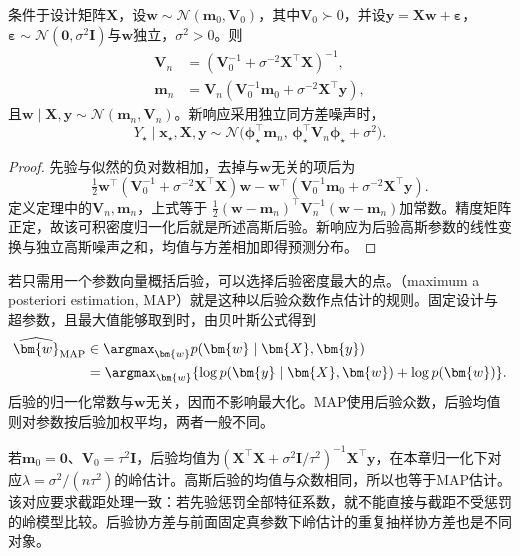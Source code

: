 \begin{theorem}[贝叶斯线性回归的后验与预测]
  \label{thm:regression-bayesian-linear}
  条件于设计矩阵$\bm{X}$，设$\bm{w}\sim\mathcal{N}(\bm{m}_0,\bm{V}_0)$，其中$\bm{V}_0\succ0$，并设$\bm{y}=\bm{X}\bm{w}+\bm{\varepsilon}$，$\bm{\varepsilon}\sim\mathcal{N}(\bm{0},\sigma^2\bm{I})$与$\bm{w}$独立，$\sigma^2>0$。则
  \[
    \begin{aligned}
      \bm{V}_n&=(\bm{V}_0^{-1}+\sigma^{-2}\bm{X}^{\top}\bm{X})^{-1},\\
      \bm{m}_n&=\bm{V}_n
          (\bm{V}_0^{-1}\bm{m}_0+\sigma^{-2}\bm{X}^{\top}\bm{y}),
    \end{aligned}
  \]
  且$\bm{w}\mid\bm{X},\bm{y}\sim\mathcal{N}(\bm{m}_n,\bm{V}_n)$。新响应采用独立同方差噪声时，
  \[
    Y_{\star}\mid\bm{x}_{\star},\bm{X},\bm{y}
    \sim\mathcal{N}\bigl(
      \bm{\phi}_{\star}^{\top}\bm{m}_n,\,
      \bm{\phi}_{\star}^{\top}\bm{V}_n\bm{\phi}_{\star}+\sigma^2\bigr).
  \]
\end{theorem}

\begin{proof}
先验与似然的负对数相加，去掉与$\bm{w}$无关的项后为
\[
  \tfrac12\bm{w}^{\top}
       (\bm{V}_0^{-1}+\sigma^{-2}\bm{X}^{\top}\bm{X})\bm{w}
  -\bm{w}^{\top}
       (\bm{V}_0^{-1}\bm{m}_0+\sigma^{-2}\bm{X}^{\top}\bm{y}).
\]
定义定理中的$\bm{V}_n,\bm{m}_n$，上式等于
$\tfrac12(\bm{w}-\bm{m}_n)^{\top}\bm{V}_n^{-1}(\bm{w}-\bm{m}_n)$加常数。精度矩阵正定，故该可积密度归一化后就是所述高斯后验。新响应为后验高斯参数的线性变换与独立高斯噪声之和，均值与方差相加即得预测分布。
\end{proof}

若只需用一个参数向量概括后验，可以选择后验密度最大的点。（maximum a posteriori estimation, MAP）就是这种以后验众数作点估计的规则。固定设计与超参数，且最大值能够取到时，由贝叶斯公式得到
\begin{equation}
  \begin{aligned}
    \widehat{\bm{w}}_{\mathrm{MAP}}
      &\in\argmax_{\bm{w}}p(\bm{w}\mid\bm{X},\bm{y})\\
      &=\argmax_{\bm{w}}
        \{\log p(\bm{y}\mid\bm{X},\bm{w})+\log p(\bm{w})\}.
  \end{aligned}
  \label{eq:regression-map}
\end{equation}
后验的归一化常数与$\bm{w}$无关，因而不影响最大化。MAP使用后验众数，后验均值则对参数按后验加权平均，两者一般不同。

若$\bm{m}_0=\bm{0}$、$\bm{V}_0=\tau^2\bm{I}$，后验均值为$(\bm{X}^{\top}\bm{X}+\sigma^2\bm{I}/\tau^2)^{-1}\bm{X}^{\top}\bm{y}$，在本章归一化下对应$\lambda=\sigma^2/(n\tau^2)$的岭估计。高斯后验的均值与众数相同，所以也等于MAP估计。该对应要求截距处理一致：若先验惩罚全部特征系数，就不能直接与截距不受惩罚的岭模型比较。后验协方差与前面固定真参数下岭估计的重复抽样协方差也是不同对象。

